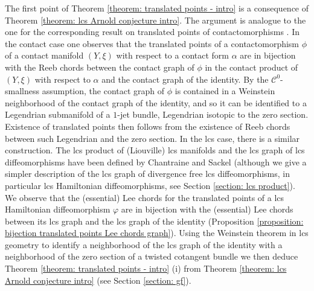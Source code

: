 \documentclass{amsart}
\theoremstyle{remark}
\begin{document}
The first point of Theorem \ref{theorem: translated points - intro}
is a consequence of Theorem \ref{theorem: lcs Arnold conjecture intro}.
The argument is analogue to the one
for the corresponding result on translated points of contactomorphisms
\cite{S - Morse estimate for translated points, S - Iterated}.
In the contact case one observes that
the translated points of a contactomorphism $\phi$
of a contact manifold $(Y, \xi)$
with respect to a contact form $\alpha$
are in bijection with the Reeb chords
between the contact graph of $\phi$
in the contact product of $(Y, \xi)$
with respect to $\alpha$
and the contact graph of the identity.
By the $\mathcal{C}^0$-smallness assumption,
the contact graph of $\phi$ is contained in a Weinstein neighborhood
of the contact graph of the identity,
and so it can be identified to a Legendrian submanifold
of a $1$-jet bundle,
Legendrian isotopic to the zero section.
Existence of translated points then follows
from the existence of Reeb chords
between such Legendrian and the zero section.
In the lcs case,
there is a similar construction.
The lcs product of (Liouville) lcs manifolds
and the lcs graph of lcs diffeomorphisms
have been defined by Chantraine and Sackel \cite{CS}
(although we give a simpler description
of the lcs graph of divergence free lcs diffeomorphisms,
in particular lcs Hamiltonian diffeomorphisms,
see Section \ref{section: lcs product}).
We observe that the (essential) Lee chords
for the translated points
of a lcs Hamiltonian diffeomorphism $\varphi$
are in bijection with the (essential) Lee chords
between its lcs graph
and the lcs graph of the identity
(Proposition \ref{proposition: bijection translated points Lee chords graph}).
Using the Weinstein theorem in lcs geometry
to identify a neighborhood of the lcs graph of the identity
with a neighborhood of the zero section of a twisted cotangent bundle
we then deduce Theorem \ref{theorem: translated points - intro} (i)
from Theorem \ref{theorem: lcs Arnold conjecture intro}
(see Section \ref{section: gf}).
\end{document}
